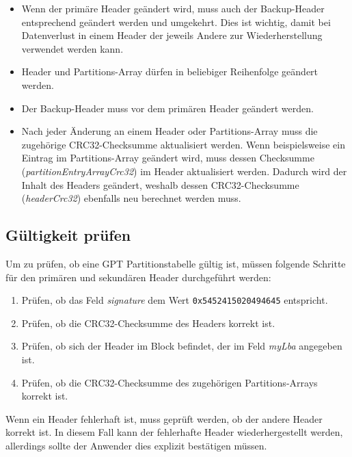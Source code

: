 \begin{itemize}
    \item Wenn der primäre Header geändert wird, muss auch der Backup-Header entsprechend geändert werden und umgekehrt.
    Dies ist wichtig, damit bei Datenverlust in einem Header der jeweils Andere zur Wiederherstellung verwendet werden kann.

    \item Header und Partitions-Array dürfen in beliebiger Reihenfolge geändert werden.
    
    \item Der Backup-Header muss vor dem primären Header geändert werden.

    \item Nach jeder Änderung an einem Header oder Partitions-Array muss die zugehörige CRC32-Checksumme aktualisiert werden.
    Wenn beispielsweise ein Eintrag im Partitions-Array geändert wird, muss dessen Checksumme (\textit{partitionEntryArrayCrc32}) im Header aktualisiert werden.
    Dadurch wird der Inhalt des Headers geändert, weshalb dessen CRC32-Checksumme (\textit{headerCrc32}) ebenfalls neu berechnet werden muss.
\end{itemize}

\subsection{Gültigkeit prüfen}
Um zu prüfen, ob eine GPT Partitionstabelle gültig ist, müssen folgende Schritte für den primären und sekundären Header durchgeführt werden:

\newpage
\begin{enumerate}
    \item Prüfen, ob das Feld \textit{signature} dem Wert \texttt{0x5452415020494645} entspricht.
    \item Prüfen, ob die CRC32-Checksumme des Headers korrekt ist.
    \item Prüfen, ob sich der Header im Block befindet, der im Feld \textit{myLba} angegeben ist.
    \item Prüfen, ob die CRC32-Checksumme des zugehörigen Partitions-Arrays korrekt ist.
\end{enumerate}

Wenn ein Header fehlerhaft ist, muss geprüft werden, ob der andere Header korrekt ist.
In diesem Fall kann der fehlerhafte Header wiederhergestellt werden, allerdings sollte der Anwender dies explizit bestätigen müssen.\cite{uefi-spec}

